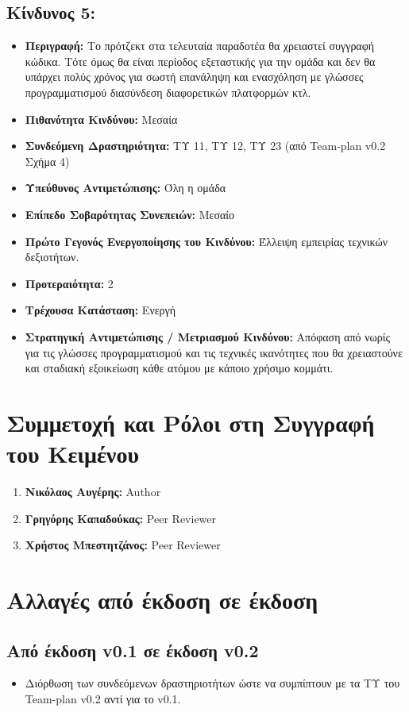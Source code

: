 \documentclass[12pt,a4paper]{article}
\begin{document}
\subsection*{Κίνδυνος 5:}
\begin{itemize}
	\item \textbf{Περιγραφή:} Το πρότζεκτ στα τελευταία παραδοτέα θα χρειαστεί συγγραφή κώδικα. Τότε όμως θα είναι περίοδος εξεταστικής για την ομάδα και δεν θα υπάρχει πολύς χρόνος για σωστή επανάληψη και ενασχόληση με γλώσσες προγραμματισμού διασύνδεση διαφορετικών πλατφορμών κτλ.
	\item \textbf{Πιθανότητα Κινδύνου:} Μεσαία
	\item \textbf{Συνδεόμενη Δραστηριότητα:} ΤΥ 11, ΤΥ 12, ΤΥ 23 (από Team-plan v0.2 Σχήμα 4)
	\item \textbf{Υπεύθυνος Αντιμετώπισης:} Όλη η ομάδα
	\item \textbf{Επίπεδο Σοβαρότητας Συνεπειών:} Μεσαίο
	\item \textbf{Πρώτο Γεγονός Ενεργοποίησης του Κινδύνου:} Έλλειψη εμπειρίας τεχνικών δεξιοτήτων.
	\item \textbf{Προτεραιότητα:} 2
	\item \textbf{Τρέχουσα Κατάσταση:} Ενεργή
	\item \textbf{Στρατηγική Αντιμετώπισης / Μετριασμού Κινδύνου:} Απόφαση από νωρίς για τις γλώσσες προγραμματισμού και τις τεχνικές ικανότητες που θα χρειαστούνε και σταδιακή εξοικείωση κάθε ατόμου με κάποιο χρήσιμο κομμάτι.
\end{itemize}

\section{Συμμετοχή και Ρόλοι στη Συγγραφή του Κειμένου}
\begin{enumerate}
	\item \textbf{Νικόλαος Αυγέρης:} Author
	\item \textbf{Γρηγόρης Καπαδούκας:} Peer Reviewer
	\item \textbf{Χρήστος Μπεστητζάνος:} Peer Reviewer
\end{enumerate}

\section{Αλλαγές από έκδοση σε έκδοση}

\subsection{Από έκδοση v0.1 σε έκδοση v0.2}
\begin{itemize}
    \item Διόρθωση των συνδεόμενων δραστηριοτήτων ώστε να συμπίπτουν με τα ΤΥ του Team-plan v0.2 αντί για το v0.1.
\end{itemize}
\end{document}
